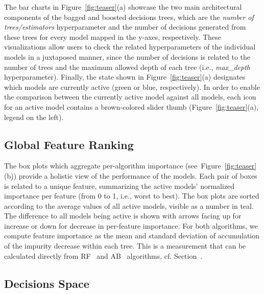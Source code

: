 The bar charts in Figure~\ref{fig:teaser}(a) showcase the two main architectural components of the bagged and boosted decisions trees, which are the \emph{number of trees/estimators} hyperparameter and the number of decisions generated from these trees for every model mapped in the y-axes, respectively. These visualizations allow users to check the related hyperparameters of the individual models in a juxtaposed manner, since the number of decisions is related to the number of trees and the maximum allowed depth of each tree (i.e., \emph{max\_depth} hyperparameter). Finally, the state shown in Figure~\ref{fig:teaser}(a) designates which models are currently active (green or blue, respectively). In order to enable the comparison between the currently active model against all models, each icon for an active model contains a brown-colored slider thumb (Figure~\ref{fig:teaser}(a), legend on the left).

\subsection{Global Feature Ranking} \label{sec:features}

The box plots which aggregate per-algorithm importance (see~Figure~\ref{fig:teaser}(b)) provide a holistic view of the performance of the models. Each pair of boxes is related to a unique feature, summarizing the active models' normalized importance per feature (from 0 to 1, i.e., worst to best). The box plots are sorted according to the average values of all active models, visible as a number in teal. The difference to all models being active is shown with arrows facing up for increase or down for decrease in per-feature importance. For both algorithms, we compute feature importance as the mean and standard deviation of accumulation of the impurity decrease within each tree. This is a measurement that can be calculated directly from RF~\cite{Rogers2006Identifying} and AB~\cite{Wang2012AdaBoost} algorithms, cf. Section~.

\subsection{Decisions Space} \label{sec:space}

